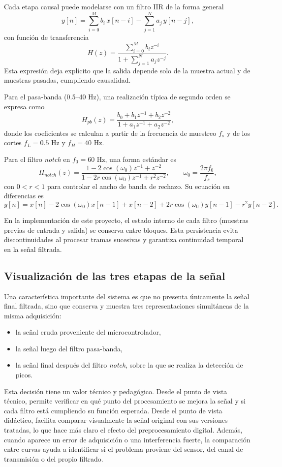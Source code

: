 Cada etapa causal puede modelarse con un filtro IIR de la forma general
\[
y[n] = \sum_{i=0}^{M} b_i\,x[n-i] - \sum_{j=1}^{N} a_j\,y[n-j],
\]
con función de transferencia
\[
H(z)=\frac{\sum_{i=0}^{M} b_i z^{-i}}{1+\sum_{j=1}^{N} a_j z^{-j}}.
\]
Esta expresión deja explícito que la salida depende solo de la muestra actual y de muestras pasadas, cumpliendo causalidad.

Para el pasa-banda (0.5--40 Hz), una realización típica de segundo orden se expresa como
\[
H_{pb}(z)=\frac{b_0+b_1 z^{-1}+b_2 z^{-2}}{1+a_1 z^{-1}+a_2 z^{-2}},
\]
donde los coeficientes se calculan a partir de la frecuencia de muestreo $f_s$ y de los cortes $f_L=0.5$ Hz y $f_H=40$ Hz.

Para el filtro \textit{notch} en $f_0=60$ Hz, una forma estándar es
\[
H_{notch}(z)=\frac{1-2\cos(\omega_0)z^{-1}+z^{-2}}{1-2r\cos(\omega_0)z^{-1}+r^2 z^{-2}},
\qquad \omega_0=\frac{2\pi f_0}{f_s},
\]
con $0<r<1$ para controlar el ancho de banda de rechazo. Su ecuación en diferencias es
\[
y[n]=x[n]-2\cos(\omega_0)x[n-1]+x[n-2]+2r\cos(\omega_0)y[n-1]-r^2 y[n-2].
\]

En la implementación de este proyecto, el estado interno de cada filtro (muestras previas de entrada y salida) se conserva entre bloques. Esta persistencia evita discontinuidades al procesar tramas sucesivas y garantiza continuidad temporal en la señal filtrada.

\subsection{Visualización de las tres etapas de la señal}

Una característica importante del sistema es que no presenta únicamente la señal final filtrada, sino que conserva y muestra tres representaciones simultáneas de la misma adquisición:

\begin{itemize}
    \item la señal cruda proveniente del microcontrolador,
    \item la señal luego del filtro pasa-banda,
    \item la señal final después del filtro \textit{notch}, sobre la que se realiza la detección de picos.
\end{itemize}

Esta decisión tiene un valor técnico y pedagógico. Desde el punto de vista técnico, permite verificar en qué punto del procesamiento se mejora la señal y si cada filtro está cumpliendo su función esperada. Desde el punto de vista didáctico, facilita comparar visualmente la señal original con sus versiones tratadas, lo que hace más claro el efecto del preprocesamiento digital. Además, cuando aparece un error de adquisición o una interferencia fuerte, la comparación entre curvas ayuda a identificar si el problema proviene del sensor, del canal de transmisión o del propio filtrado.

